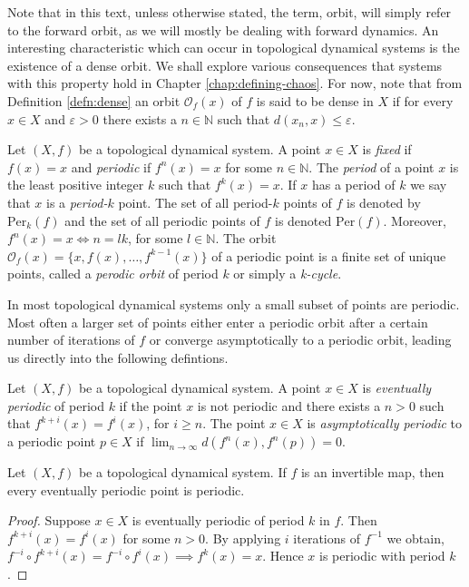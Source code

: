 Note that in this text, unless otherwise stated, the term, orbit, will simply refer to the forward orbit, as we will mostly be dealing with forward dynamics. An interesting characteristic which can occur in topological dynamical systems is the existence of a dense orbit. We shall explore various consequences that systems with this property hold in Chapter \ref{chap:defining-chaos}. For now, note that from Definition \ref{defn:dense} an orbit $\mathcal{O}_f(x)$ of $f$ is said to be dense in $X$ if for every $x \in X$ and $\varepsilon > 0$ there exists a $n \in \mathbb{N}$ such that $d(x_n, x) \leq \varepsilon$.

\begin{defn} \label{defn:periodic-point}
    Let $(X, f)$ be a topological dynamical system. A point $x \in X$ is \emph{fixed} if $f(x) = x$ and \emph{periodic} if $f^n(x) = x$ for some $n \in \mathbb{N}$. The \emph{period} of a point $x$ is the least positive integer $k$ such that $f^k(x) = x$. If $x$ has a period of $k$ we say that $x$ is a \emph{period-$k$} point. The set of all period-$k$ points of $f$ is denoted by $\text{Per}_k(f)$ and the set of all periodic points of $f$ is denoted $\text{Per}(f)$. Moreover, $f^n(x) = x \iff n = lk$, for some $l \in \mathbb{N}$. The orbit $\mathcal{O}_f(x) = \lbrace x, f(x), \dots, f^{k-1}(x) \rbrace$ of a periodic point is a finite set of unique points, called a \emph{perodic orbit} of period $k$ or simply a \emph{k-cycle}.
\end{defn}

In most topological dynamical systems only a small subset of points are periodic. Most often a larger set of points either enter a periodic orbit after a certain number of iterations of $f$ or converge asymptotically to a periodic orbit, leading us directly into the following defintions.

\begin{defn} \label{defn:eventually-asymptotically-periodic}
    Let $(X, f)$ be a topological dynamical system. A point $x \in X$ is \emph{eventually periodic} of period $k$ if the point $x$ is not periodic and there exists a $n > 0$ such that $f^{k+i}(x) = f^i(x)$, for $i \geq n$. The point $x \in X$ is \emph{asymptotically periodic} to a periodic point $p \in X$ if $\lim_{n \to \infty} d(f^n(x), f^n(p)) = 0$.
\end{defn}

\begin{prop} \label{prop:eventually-periodic-implies-periodic}
    Let $(X, f)$ be a topological dynamical system. If $f$ is an invertible map, then every eventually periodic point is periodic.
    \begin{proof}
        Suppose $x \in X$ is eventually periodic of period $k$ in $f$. Then $f^{k + i}(x) = f^i(x)$ for some $n > 0$. By applying $i$ iterations of $f^{-1}$ we obtain, $f^{-i} \circ f^{k + i}(x) = f^{-i} \circ f^{i}(x) \implies f^k(x) = x$. Hence $x$ is periodic with period $k$.
    \end{proof}
\end{prop}

